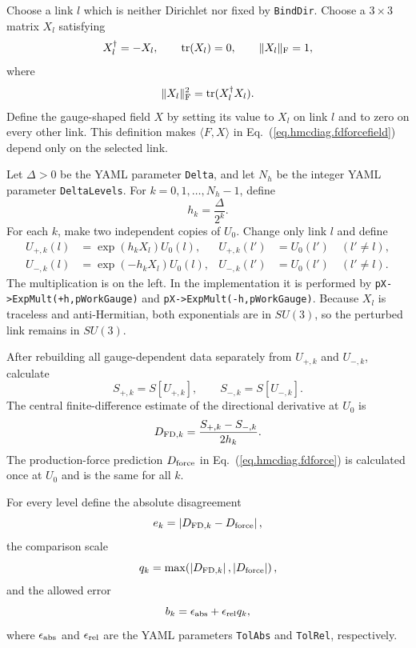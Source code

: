 Choose a link $l$ which is neither Dirichlet nor fixed by \texttt{BindDir}.
Choose a $3\times3$ matrix $X_l$ satisfying
\begin{equation}
X_l^\dagger=-X_l,\qquad
{\rm tr}(X_l)=0,\qquad
\lVert X_l\rVert_{\rm F}=1,
\label{eq.hmcdiag.x}
\end{equation}
where
\begin{equation}
\lVert X_l\rVert_{\rm F}^2
={\rm tr}(X_l^\dagger X_l).
\end{equation}
Define the gauge-shaped field $X$ by setting its value to $X_l$ on link $l$
and to zero on every other link.  This definition makes
$\langle F,X\rangle$ in Eq.~(\ref{eq.hmcdiag.fdforcefield}) depend only on the
selected link.

Let $\Delta>0$ be the YAML parameter \texttt{Delta}, and let $N_h$ be the
integer YAML parameter \texttt{DeltaLevels}.  For
$k=0,1,\ldots,N_h-1$, define
\begin{equation}
h_k=\frac{\Delta}{2^k}.
\label{eq.hmcdiag.hk}
\end{equation}
For each $k$, make two independent copies of $U_0$.  Change only link $l$ and
define
\begin{align}
U_{+,k}(l)&=\exp(h_kX_l)U_0(l),
&U_{+,k}(l')&=U_0(l')\quad(l'\ne l),
\label{eq.hmcdiag.uplus}\\
U_{-,k}(l)&=\exp(-h_kX_l)U_0(l),
&U_{-,k}(l')&=U_0(l')\quad(l'\ne l).
\label{eq.hmcdiag.uminus}
\end{align}
The multiplication is on the left.  In the implementation it is performed by
\texttt{pX->ExpMult(+h,pWorkGauge)} and
\texttt{pX->ExpMult(-h,pWorkGauge)}.  Because $X_l$ is traceless and
anti-Hermitian, both exponentials are in $SU(3)$, so the perturbed link remains
in $SU(3)$.

After rebuilding all gauge-dependent data separately from $U_{+,k}$ and
$U_{-,k}$, calculate
\begin{equation}
S_{+,k}=S[U_{+,k}],\qquad S_{-,k}=S[U_{-,k}].
\label{eq.hmcdiag.spm}
\end{equation}
The central finite-difference estimate of the directional derivative at
$U_0$ is
\begin{equation}
D_{{\rm FD},k}
=\frac{S_{+,k}-S_{-,k}}{2h_k}.
\label{eq.hmcdiag.fd}
\end{equation}
The production-force prediction $D_{\rm force}$ in
Eq.~(\ref{eq.hmcdiag.fdforce}) is calculated once at $U_0$ and is the same for
all $k$.

For every level define the absolute disagreement
\begin{equation}
e_k=\left|D_{{\rm FD},k}-D_{\rm force}\right|,
\label{eq.hmcdiag.error}
\end{equation}
the comparison scale
\begin{equation}
q_k=\max\!\left(\left|D_{{\rm FD},k}\right|,
                 \left|D_{\rm force}\right|\right),
\label{eq.hmcdiag.scale}
\end{equation}
and the allowed error
\begin{equation}
b_k=\epsilon_{\rm abs}+\epsilon_{\rm rel}q_k,
\label{eq.hmcdiag.bound}
\end{equation}
where $\epsilon_{\rm abs}$ and $\epsilon_{\rm rel}$ are the YAML parameters
\texttt{TolAbs} and \texttt{TolRel}, respectively.

